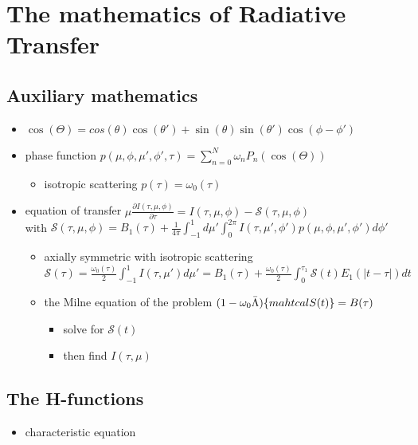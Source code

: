 \documentclass[../main/main.tex]{subfiles}
\begin{document}
\newpage
\section{The mathematics of Radiative Transfer}
\subsection{Auxiliary mathematics}

\begin{itemize}

\item $\cos(\Theta) = cos(\theta)\cos(\theta') + \sin(\theta)\sin(\theta') \cos(\phi-\phi')$

\item phase function $\boxed{p(\mu,\phi,\mu',\phi',\tau) = \sum_{n=0}^N \omega_n P_n(\cos(\Theta))}$
\begin{itemize}

\item isotropic scattering $p(\tau) = \omega_0(\tau)$
\end{itemize}

\item equation of transfer $\boxed{\mu \frac{\partial I(\tau,\mu,\phi)}{\partial \tau} = I(\tau,\mu,\phi) - \mathcal{S}(\tau,\mu,\phi)}$ 
\\ with $\mathcal{S}(\tau,\mu,\phi) = B_1(\tau) + \frac{1}{4 \pi} \int_{-1}^{1} d\mu' \int_0^{2\pi} I(\tau,\mu',\phi') p(\mu,\phi,\mu',\phi') d\phi'$
\begin{itemize}
\item axially symmetric with isotropic scattering \\
$\mathcal{S}(\tau) = \frac{\omega_0(\tau)}{2} \int_{-1}^{1} I(\tau,\mu') d\mu' = 
B_1(\tau) + \frac{\omega_0(\tau)}{2} \int_0^{\tau_1} \mathcal{S} (t) E_1(|t-\tau|)dt $
\item the Milne equation of the problem $(1-\omega_0 \bar{\Lambda})\{ \\mahtcal{S}(t)\} = B(\tau)$
\begin{itemize}
\item solve for $\mathcal{S}(t)$
\item then find $I(\tau,\mu)$
\end{itemize}

\end{itemize}
\end{itemize}

\subsection{The H-functions}
\begin{itemize}
\item characteristic equation
\end{itemize}
\end{document}
